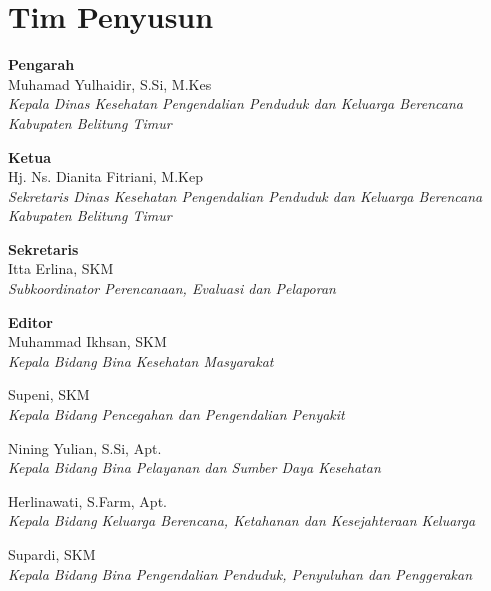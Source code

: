 {}

\section*{Tim Penyusun}
{\parindent0pt
\textbf{Pengarah}\\
\smallskip
Muhamad Yulhaidir, S.Si, M.Kes\\
\emph{Kepala Dinas Kesehatan Pengendalian Penduduk dan Keluarga Berencana\\Kabupaten Belitung Timur}
\bigskip{}

\textbf{Ketua}\\
\smallskip
Hj. Ns. Dianita Fitriani, M.Kep\\
\emph{Sekretaris Dinas Kesehatan Pengendalian Penduduk dan Keluarga Berencana\\Kabupaten Belitung Timur}
\bigskip{}

\textbf{Sekretaris}\\
\smallskip
Itta Erlina, SKM\\
\emph{Subkoordinator Perencanaan, Evaluasi dan Pelaporan}
\bigskip{}

\textbf{Editor}\\
\smallskip
Muhammad Ikhsan, SKM\\
\emph{Kepala Bidang Bina Kesehatan Masyarakat}
\smallskip

Supeni, SKM\\
\emph{Kepala Bidang Pencegahan dan Pengendalian Penyakit}
\smallskip

Nining Yulian, S.Si, Apt.\\
\emph{Kepala Bidang Bina Pelayanan dan Sumber Daya Kesehatan}
\smallskip

Herlinawati, S.Farm, Apt.\\
\emph{Kepala Bidang Keluarga Berencana, Ketahanan dan Kesejahteraan
Keluarga}
\smallskip

Supardi, SKM\\
\emph{Kepala Bidang Bina Pengendalian Penduduk, Penyuluhan dan Penggerakan}
\bigskip

}
